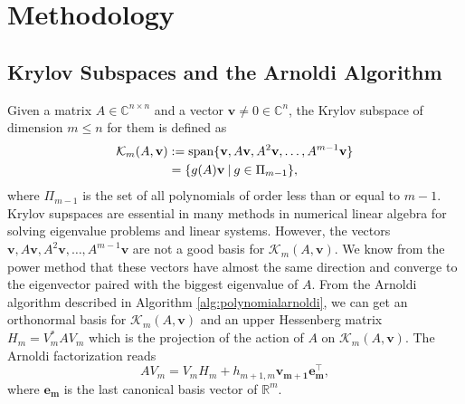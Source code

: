\section{Methodology}
\label{sec:methods}

\subsection{Krylov Subspaces and the Arnoldi Algorithm}\label{sec:arnoldi}
Given a matrix $A \in \mathbb{C}^{n \times n}$ and a vector $\mathbf{v} \neq 0 \in \mathbb{C}^n$,
the Krylov subspace of dimension $m \leq n$ for them is defined \cite{golub2013matrix} as
\begin{equation}
    \label{eq:krylovsubspacedefinition}
    \begin{aligned}
        \mathcal{K}_m(A, \mathbf{v})
        & :=\operatorname{span}\{\mathbf{v}, A\mathbf{v}, A^{2}\mathbf{v}, \dots, A^{m-1}\mathbf{v} \}\\
         & = \{g(A)\mathbf{v} \:|\: g \in \Pi_{m-1} \},
    \end{aligned}
\end{equation}
where $\Pi_{m-1}$ is the set of all polynomials of order less than or equal to $m-1$.
Krylov supspaces are essential in many methods in numerical linear algebra
for solving eigenvalue problems and linear systems.
However, the vectors $\mathbf{v}, A\mathbf{v}, A^{2}\mathbf{v}, \dots, A^{m-1}\mathbf{v}$
are not a good basis for $\mathcal{K}_m(A, \mathbf{v})$. We know from the power method that
these vectors have almost the same direction and converge to the eigenvector paired
with the biggest eigenvalue of $A$.
From the Arnoldi algorithm \cite{trefethen1997numerical} described in Algorithm
\ref{alg:polynomialarnoldi}, we can get an orthonormal basis for $\mathcal{K}_m(A, \mathbf{v})$
and an upper Hessenberg matrix $H_m = V_m^* A V_m$ which is the projection of the action of
$A$ on $\mathcal{K}_m(A, \mathbf{v})$. The Arnoldi factorization reads
\begin{equation}
    \label{eq:arnoldifactorization}
    A V_m = V_m H_m + h_{m+1, m} \mathbf{v_{m+1}} \mathbf{e_m^\top},
\end{equation}
where $\mathbf{e_m}$ is the last canonical basis vector of $\mathbb{R}^{m}$.

